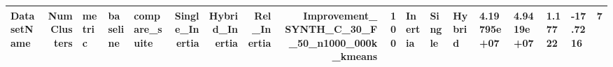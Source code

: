 \begin{tabular}{lrlllrrrrr}
\toprule
DatasetName & NumClusters & metric & baseline & compare_suite & Single_Inertia & Hybrid_Inertia & Rel_Inertia & Improvement_%
\midrule
SYNTH_C_30_F_50_n1000_000k_kmeans & 100 & Inertia & Single & Hybrid & 4.19795e+07 & 4.9419e+07 & 1.17722 & -17.7216 & 7 \\
\bottomrule
\end{tabular}
